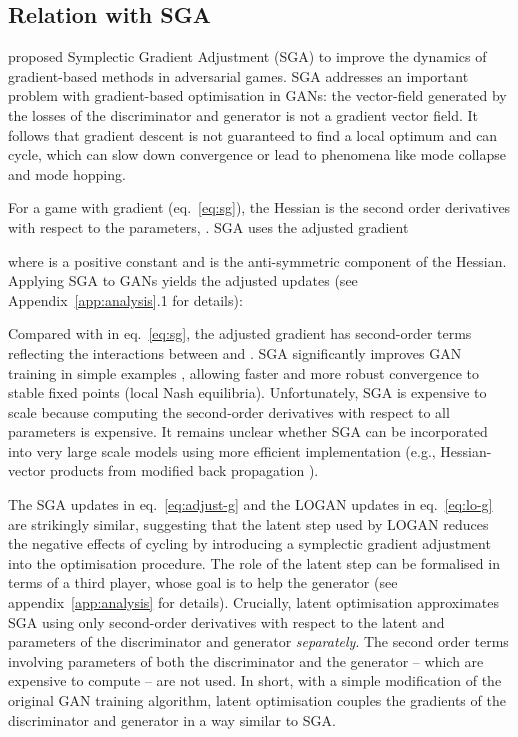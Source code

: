 \documentclass{article} \usepackage{iclr2020_conference,times}
\begin{document}
\subsection{Relation with SGA}

\citet{balduzzi2018mechanics, gemp:18} proposed Symplectic Gradient Adjustment (SGA) to improve the dynamics of gradient-based methods in adversarial games. SGA addresses an important problem with gradient-based optimisation in GANs: the vector-field generated by the losses of the discriminator and generator is not a gradient vector field. It follows that gradient descent is not guaranteed to find a local optimum and can cycle, which can slow down convergence or lead to phenomena like mode collapse and mode hopping. 

For a game with gradient  (eq.~\ref{eq:sg}), the Hessian is the second order derivatives with respect to the parameters, . SGA uses the adjusted gradient

where  is a positive constant and  is the anti-symmetric component of the Hessian. Applying SGA to GANs yields the adjusted updates (see Appendix~\ref{app:analysis}.1 for details):

Compared with  in eq.~\ref{eq:sg}, the adjusted gradient  has second-order terms reflecting the interactions between  and . SGA significantly improves GAN training in simple examples \citep{balduzzi2018mechanics}, allowing faster and more robust convergence to stable fixed points (local Nash equilibria). 
Unfortunately, SGA is expensive to scale because computing the second-order derivatives with respect to all parameters is expensive. It remains unclear whether SGA can be incorporated into very large scale models using more efficient implementation (e.g., Hessian-vector products from modified back propagation \cite{pearlmutter1994fast}).

The SGA updates in eq.~\ref{eq:adjust-g} and the LOGAN updates in eq.~\ref{eq:lo-g} are strikingly similar, suggesting that the latent step used by LOGAN reduces the negative effects of cycling by introducing a symplectic gradient adjustment into the optimisation procedure. The role of the latent step can be formalised in terms of a third player, whose goal is to help the generator (see appendix~\ref{app:analysis} for details).  
Crucially, latent optimisation approximates SGA using only second-order derivatives with respect to the latent  and parameters of the discriminator and generator \emph{separately}. The second order terms involving parameters of both the discriminator and the generator -- which are expensive to compute -- are not used. In short, with a simple modification of the original GAN training algorithm, latent optimisation couples the gradients of the discriminator and generator in a way similar to SGA.
\end{document}
